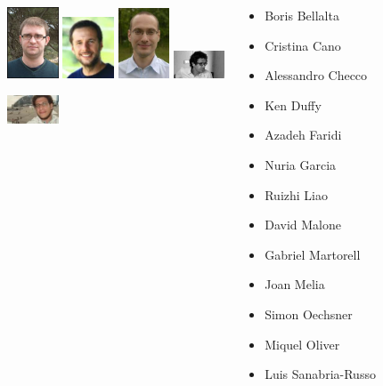 \documentclass{beamer}
\begin{document}
\begin{frame}
\begin{columns}[t]
\begin{center}
        \includegraphics[width=0.6in]{figures/gabriel}
        \includegraphics[width=0.6in]{figures/joan}
        \includegraphics[width=0.6in]{figures/simon}
        \includegraphics[width=0.6in]{figures/miquel}

        \includegraphics[width=0.6in]{figures/luis}
      \end{center}
      \begin{block}{}
        \begin{itemize}
          \item Boris Bellalta
          \item Cristina Cano
          \item Alessandro Checco
          \item Ken Duffy
          \item Azadeh Faridi
          \item Nuria Garcia
          \item Ruizhi Liao
          \item David Malone
          \item Gabriel Martorell
          \item Joan Melia
          \item Simon Oechsner
          \item Miquel Oliver
          \item Luis Sanabria-Russo
        \end{itemize}
      \end{block}
  \end{columns}
\end{frame}
\end{document}
